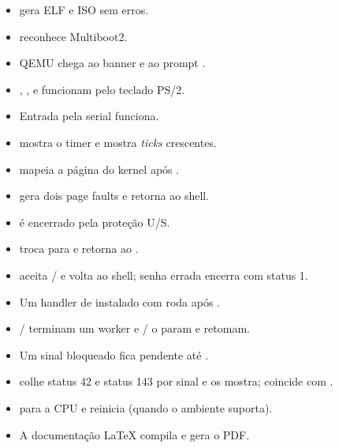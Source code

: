 \begin{itemize}
  \item[$\square$]  gera ELF e ISO sem erros.
  \item[$\square$]  reconhece Multiboot2.
  \item[$\square$] QEMU chega ao banner e ao prompt .
  \item[$\square$] , ,  e 
        funcionam pelo teclado PS/2.
  \item[$\square$] Entrada pela serial funciona.
  \item[$\square$]  mostra o timer e  mostra
        \emph{ticks} crescentes.
  \item[$\square$]  mapeia a p\'agina do kernel ap\'os
        .
  \item[$\square$]  gera dois page faults e retorna ao shell.
  \item[$\square$]  \'e encerrado pela prote\c{c}\~ao U/S.
  \item[$\square$]  troca para  e 
        retorna ao .
  \item[$\square$]  aceita / e volta ao
        shell; senha errada encerra com status 1.
  \item[$\square$] Um handler de  instalado com
         roda ap\'os .
  \item[$\square$] / terminam um worker e
        / o param e retomam.
  \item[$\square$] Um sinal bloqueado fica pendente at\'e
        .
  \item[$\square$]  colhe status 42 e status 143 por sinal e os
        mostra;  coincide com .
  \item[$\square$]  para a CPU e  reinicia (quando o
        ambiente suporta).
  \item[$\square$] A documenta\c{c}\~ao LaTeX compila e gera o PDF.
\end{itemize}
